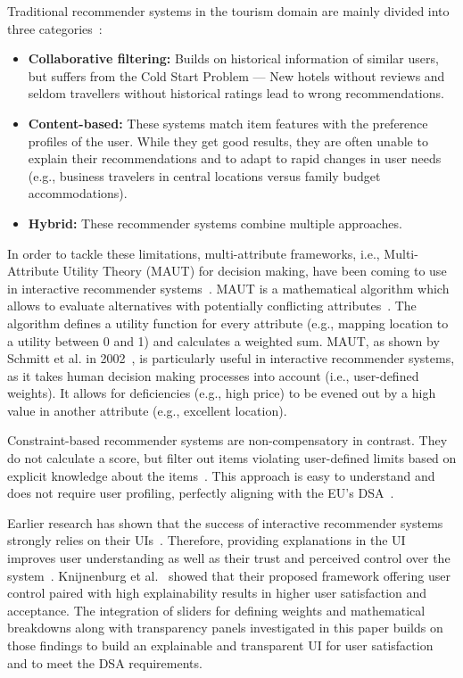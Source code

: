 \documentclass[acmlarge]{acmart}
\begin{document}
Traditional recommender systems  in the tourism domain are mainly divided into three categories~\cite{Sarkar2023, 8308293}:
\begin{itemize}
  \item \textbf{Collaborative filtering:} Builds on historical information of similar users, but suffers from the Cold Start Problem --- New hotels without reviews and seldom travellers without historical ratings lead to wrong recommendations.
  \item \textbf{Content-based:} These systems match item features with the preference profiles of the user. While they get good results, they are often unable to explain their recommendations and to adapt to rapid changes in user needs (e.g., business travelers in central locations versus family budget accommodations).
  \item \textbf{Hybrid:} These recommender systems combine multiple approaches.
\end{itemize}

In order to tackle these limitations, multi-attribute frameworks, i.e., Multi-Attribute Utility Theory (MAUT) for decision making, have been coming to use in interactive recommender systems~\cite{schmitt2002maut}. MAUT is a mathematical algorithm which allows to evaluate alternatives with potentially conflicting attributes~\cite{keeney1993decisions}. The algorithm defines a utility function for every attribute (e.g., mapping location to a utility between 0 and 1) and calculates a weighted sum. MAUT, as shown by Schmitt et al. in 2002~\cite{schmitt2002maut}, is particularly useful in interactive recommender systems, as it takes human decision making processes into account (i.e., user-defined weights). It allows for deficiencies (e.g., high price) to be evened out by a high value in another attribute (e.g., excellent location).

Constraint-based recommender systems are non-compensatory in contrast. They do not calculate a score, but filter out items violating user-defined limits based on explicit knowledge about the items~\cite{ricci2011travel}. This approach is easy to understand and does not require user profiling, perfectly aligning with the EU's DSA~\cite{eudsa2022}.

Earlier research has shown that the success of interactive recommender systems strongly relies on their UIs~\cite{mcnee2006being,swearingen2001beyond}. Therefore, providing explanations in the UI improves user understanding as well as their trust and perceived control over the system~\cite{tintarev2012evaluating}. Knijnenburg et al.~\cite{knijnenburg2012explaining} showed that their proposed framework offering user control paired with high explainability results in higher user satisfaction and acceptance. The integration of sliders for defining weights and mathematical breakdowns along with transparency panels investigated in this paper builds on those findings to build an explainable and transparent UI for user satisfaction and to meet the DSA requirements.
\end{document}
